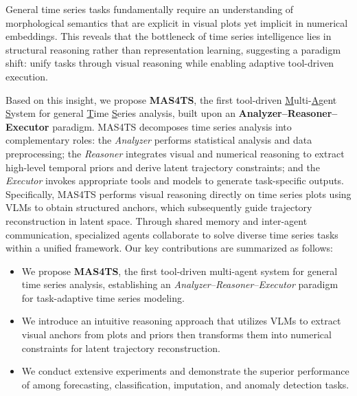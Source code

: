 General time series tasks fundamentally require an understanding of morphological semantics that are explicit in visual plots yet implicit in numerical embeddings.
This reveals that the bottleneck of time series intelligence lies in structural reasoning rather than representation learning, suggesting a paradigm shift: unify tasks through visual reasoning while enabling adaptive tool-driven execution.

Based on this insight, we propose \textbf{MAS4TS}, the first tool-driven \underline{M}ulti-\underline{A}gent \underline{S}ystem for general \underline{T}ime \underline{S}eries analysis, built upon an \textbf{Analyzer--Reasoner--Executor} paradigm.
MAS4TS decomposes time series analysis into complementary roles: the \emph{Analyzer} performs statistical analysis and data preprocessing; the \emph{Reasoner} integrates visual and numerical reasoning to extract high-level temporal priors and derive latent trajectory constraints; and the \emph{Executor} invokes appropriate tools and models to generate task-specific outputs.
Specifically, MAS4TS performs visual reasoning directly on time series plots using VLMs to obtain structured anchors, which subsequently guide trajectory reconstruction in latent space.
Through shared memory and inter-agent communication, specialized agents collaborate to solve diverse time series tasks within a unified framework.
Our key contributions are summarized as follows:
\begin{itemize}[leftmargin=*, itemsep=0pt]
\item We propose \textbf{MAS4TS}, the first tool-driven multi-agent system for general time series analysis, establishing an \textit{Analyzer--Reasoner--Executor} paradigm for task-adaptive time series modeling.
\item We introduce an intuitive reasoning approach that utilizes VLMs to extract visual anchors from plots and priors then transforms them into numerical constraints for latent trajectory reconstruction.
\item We conduct extensive experiments and demonstrate the superior performance of \model among forecasting, classification, imputation, and anomaly detection tasks.
\end{itemize}
